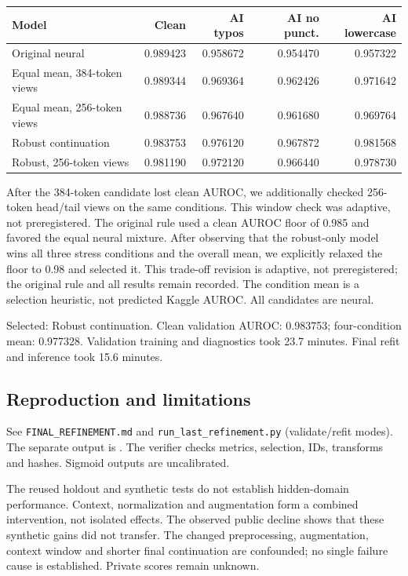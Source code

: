 \par\noindent
\begin{tabularx}{\linewidth}{@{}Yrrrr@{}}\toprule
Model & Clean & AI typos & AI no punct. & AI lowercase\\\midrule
Original neural & 0.989423 & 0.958672 & 0.954470 & 0.957322\\
Equal mean, 384-token views & 0.989344 & 0.969364 & 0.962426 & 0.971642\\
Equal mean, 256-token views & 0.988736 & 0.967640 & 0.961680 & 0.969764\\
Robust continuation & 0.983753 & 0.976120 & 0.967872 & 0.981568\\
Robust, 256-token views & 0.981190 & 0.972120 & 0.966440 & 0.978730\\
\bottomrule\end{tabularx}\par

After the 384-token candidate lost clean AUROC, we additionally checked 256-token head/tail views on the same conditions. This window check was adaptive, not preregistered. The original rule used a clean AUROC floor of 0.985 and favored the equal neural mixture. After observing that the robust-only model wins all three stress conditions and the overall mean, we explicitly relaxed the floor to 0.98 and selected it. This trade-off revision is adaptive, not preregistered; the original rule and all results remain recorded. The condition mean is a selection heuristic, not predicted Kaggle AUROC. All candidates are neural.

Selected: Robust continuation. Clean validation AUROC: 0.983753; four-condition mean: 0.977328. Validation training and diagnostics took 23.7 minutes. Final refit and inference took 15.6 minutes.

\subsection*{Reproduction and limitations}
See \texttt{FINAL\_REFINEMENT.md} and \texttt{run\_last\_refinement.py} (validate/refit modes). The separate output is . The verifier checks metrics, selection, IDs, transforms and hashes. Sigmoid outputs are uncalibrated.

The reused holdout and synthetic tests do not establish hidden-domain performance. Context, normalization and augmentation form a combined intervention, not isolated effects. The observed public decline shows that these synthetic gains did not transfer. The changed preprocessing, augmentation, context window and shorter final continuation are confounded; no single failure cause is established. Private scores remain unknown.
\endgroup
